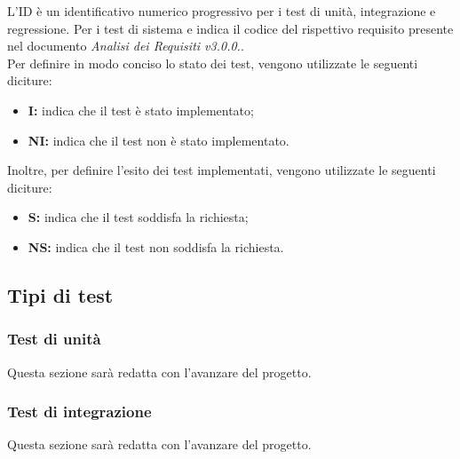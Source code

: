 L'ID è un identificativo numerico progressivo per i test di unità, integrazione e regressione. Per i test di sistema e
indica il codice del rispettivo requisito presente nel documento \textit{Analisi dei Requisiti v3.0.0.}.\\
Per definire in modo conciso lo stato dei test, vengono utilizzate le seguenti diciture:
\begin{itemize}
    \item \textbf{I:} indica che il test è stato implementato;
    \item \textbf{NI:} indica che il test non è stato implementato.
\end{itemize}
Inoltre, per definire l'esito dei test implementati, vengono utilizzate le seguenti diciture:
\begin{itemize}
    \item \textbf{S:} indica che il test soddisfa la richiesta;
    \item \textbf{NS:} indica che il test non soddisfa la richiesta.
\end{itemize}
\subsection{Tipi di test}
\subsubsection{Test di unità}
Questa sezione sarà redatta con l'avanzare del progetto.
\subsubsection{Test di integrazione}
Questa sezione sarà redatta con l'avanzare del progetto.
\pagebreak
